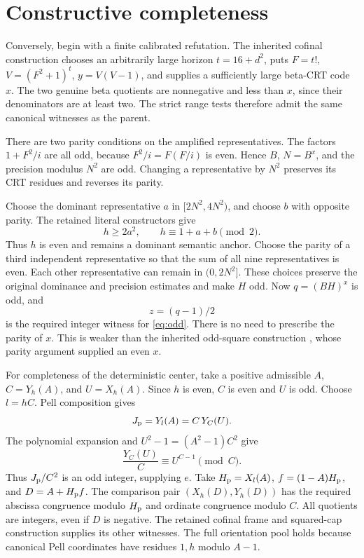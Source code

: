 \documentclass[11pt]{article}
\theoremstyle{definition}\newtheorem{definition}[theorem]{Definition}
\begin{document}
\section{Constructive completeness}

Conversely, begin with a finite calibrated refutation. The inherited
cofinal construction chooses an arbitrarily large horizon
\(t=16+d^2\), puts \(F=t!\), \(V=(F^2+1)^t\),
\(y=V(V-1)\), and supplies a sufficiently large beta-CRT code \(x\).
The two genuine beta quotients are nonnegative and less than \(x\),
since their denominators are at least two. The strict range tests
therefore admit the same canonical witnesses as the parent.

There are two parity conditions on the amplified representatives.
The factors \(1+F^2/i\) are all odd, because
\(F^2/i=F(F/i)\) is even. Hence \(B\), \(N=B^x\), and
the precision modulus \(N^2\) are odd. Changing a representative
by \(N^2\) preserves its CRT residues and reverses its parity.

Choose the dominant representative \(a\) in
\([2N^2,4N^2)\), and choose \(b\) with opposite parity.
The retained literal constructors give
\[
 h\ge2a^2,\qquad h\equiv1+a+b\pmod2.
\]
Thus \(h\) is even and remains a dominant semantic anchor.
Choose the parity of a third independent representative so that the
sum of all nine representatives is even. Each other representative
can remain in \((0,2N^2]\). These choices preserve the original
dominance and precision estimates and make \(H\) odd.
Now \(q=(BH)^x\) is odd, and
\[
 z=(q-1)/2
\]
is the required integer witness for \eqref{eq:odd}.
There is no need to prescribe the parity of \(x\).
This is weaker than the inherited odd-square construction
\cite{centered}, whose parity argument supplied an even \(x\).

For completeness of the deterministic center, take a positive
admissible \(A\), \(C=Y_h(A)\), and \(U=X_h(A)\).
Since \(h\) is even, \(C\) is even and \(U\) is odd.
Choose \(l=hC\). Pell composition gives
\[
 J_{\rm p}=Y_l(A)=C\,Y_C(U).
\]
The polynomial expansion and
\(U^2-1=(A^2-1)C^2\) give
\[
 \frac{Y_C(U)}{C}\equiv U^{C-1}\pmod C.
\]
Thus \(J_{\rm p}/C^2\) is an odd integer, supplying \(e\).
Take \(H_{\rm p}=X_l(A)\), \(f=(1-A)H_{\rm p}\), and
\(D=A+H_{\rm p}f\). The comparison pair
\((X_h(D),Y_h(D))\) has the required abscissa congruence modulo
\(H_{\rm p}\) and ordinate congruence modulo \(C\).
All quotients are integers, even if \(D\) is negative.
The retained cofinal frame and squared-cap construction supplies its
other witnesses. The full orientation pool holds because canonical
Pell coordinates have residues \(1,h\) modulo \(A-1\).
\end{document}
